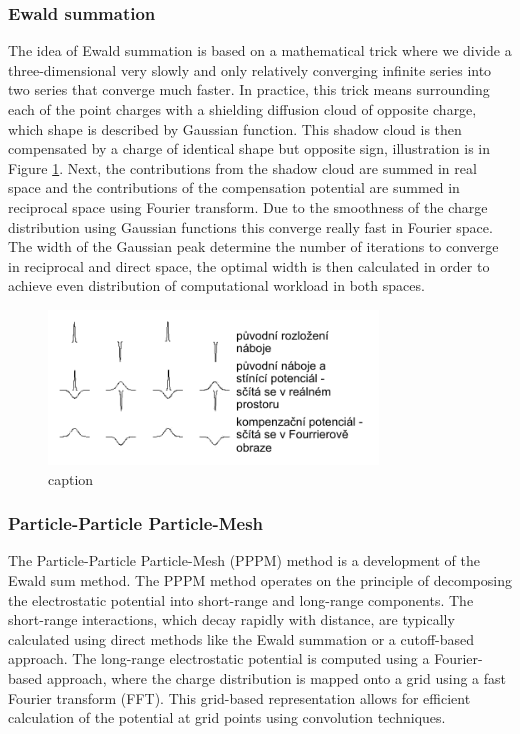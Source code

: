 \subsubsection{Ewald summation}
The idea of Ewald summation is based on a mathematical trick where we divide a three-dimensional very slowly and only relatively converging infinite series into two series that converge much faster. In practice, this trick means surrounding each of the point charges with a shielding diffusion cloud of opposite charge, which shape is described by Gaussian function. This shadow cloud is then compensated by a charge of identical shape but opposite sign, illustration is in Figure \ref{fig:ewald}. Next, the contributions from the shadow cloud are summed in real space and the contributions of the compensation potential are summed in reciprocal space using Fourier transform. Due to the smoothness of the charge distribution using Gaussian functions this converge really fast in Fourier space. The width of the Gaussian peak determine the number of iterations to converge in reciprocal and direct space, the optimal width is then calculated in order to achieve even distribution of computational workload in both spaces. \cite{Sritterova}


\begin{figure}[htb!]
	\centering
	\includegraphics[width=0.9\linewidth]{img/ewald.png} 
	\caption{caption}
	\label{fig:ewald}    
\end{figure} 

\subsubsection{Particle-Particle Particle-Mesh}
The Particle-Particle Particle-Mesh (PPPM) method \cite{eastwood_p3m3dpthree-dimensional_1980} is a development of the Ewald sum method. The PPPM method operates on the principle of decomposing the electrostatic potential into short-range and long-range components. The short-range interactions, which decay rapidly with distance, are typically calculated using direct methods like the Ewald summation or a cutoff-based approach. The long-range electrostatic potential is computed using a Fourier-based approach, where the charge distribution is mapped onto a grid using a fast Fourier transform (FFT). This grid-based representation allows for efficient calculation of the potential at grid points using convolution techniques. \cite{Sritterova}


